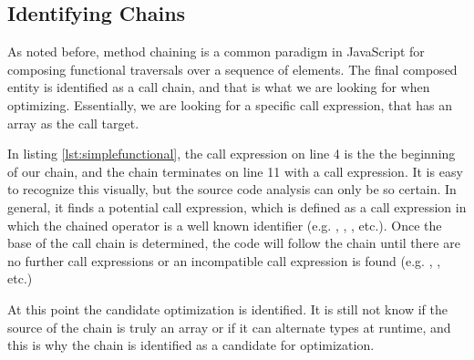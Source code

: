 \subsection{Identifying Chains}

As noted before, method chaining is a common paradigm in JavaScript for composing functional traversals over a sequence of elements.  The final composed entity is identified as a call chain, and that is what we are looking for when optimizing.  Essentially, we are looking for a specific call expression, that has an array as the call target. \\

\begin{minipage}{\linewidth}

\end{minipage}

In listing \ref{lst:simplefunctional}, the  call expression on line 4 is the the beginning of our chain, and the chain terminates on line 11 with a  call expression.  It is easy to recognize this visually, but the source code analysis can only be so certain.  In general, it finds a potential call expression, which is defined as a call expression in which the chained operator is a well known identifier (e.g. , , , etc.). Once the base of the call chain is determined, the code will follow the chain until there are no further call expressions or an incompatible call expression is found (e.g. , , etc.)

At this point the candidate optimization is identified.  It is still not know if the source of the chain is truly an array or if it can alternate types at runtime, and this is why the chain is identified as a candidate for optimization. 